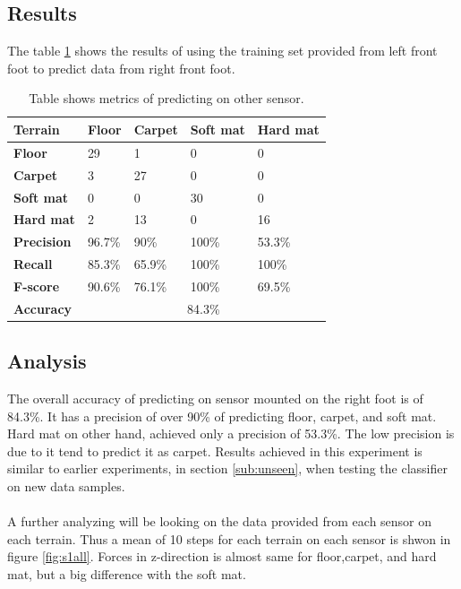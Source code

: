 \documentclass[USenglish]{ifimaster}  %
\begin{document}
\subsection{Results} 
The table \ref{tab:pred} shows the results of using the training set provided from left front foot to predict data from right front foot.
\begin{table}[h]
	\centering
	\begin{tabular}{lllll}
		\hline
		\textbf{Terrain} & \textbf{Floor} & \textbf{Carpet} & \textbf{Soft mat} & \textbf{Hard mat} \\ \hline
		\textbf{Floor} & \cellcolor[HTML]{FFFFC7}29 & 1 & 0 & 0 \\
		\textbf{Carpet} & 3 & \cellcolor[HTML]{FFFFC7}27 & 0 & 0 \\
		\textbf{Soft mat} & 0 & 0 & \cellcolor[HTML]{FFFFC7}30 & 0 \\
		\textbf{Hard mat} & 2 & 13 & 0 & \cellcolor[HTML]{FFFFC7}16 \\ \hline
		\textbf{Precision} & 96.7\% & 90\% & 100\% & 53.3\% \\
		\textbf{Recall} & 85.3\% & 65.9\% & 100\% & 100\% \\
		\textbf{F-score} & 90.6\% & 76.1\% & 100\% & 69.5\% \\ \hline
		\textbf{Accuracy} & \multicolumn{4}{c}{84.3\%} \\ \hline
	\end{tabular}
	\caption{Table shows metrics of predicting on other sensor.}
	\label{tab:pred}
\end{table}
	\FloatBarrier
	
\subsection{Analysis} 	
The overall accuracy of predicting on sensor mounted on the right foot is of 84.3\%. It has a precision of over 90\% of predicting floor, carpet, and  soft mat. Hard mat on other hand, achieved only a precision of 53.3\%. The low precision is due to it tend to predict it as carpet. Results achieved in this experiment is similar to earlier experiments,  in section \ref{sub:unseen}, when testing the classifier on new data samples. 
\\
\\
A further analyzing will be looking on the data provided from each sensor on each terrain. Thus a mean of 10 steps for each terrain on each sensor is shwon in figure \ref{fig:s1all}. Forces in z-direction is almost same for floor,carpet, and hard mat, but a big difference with the soft mat. 
\end{document}
